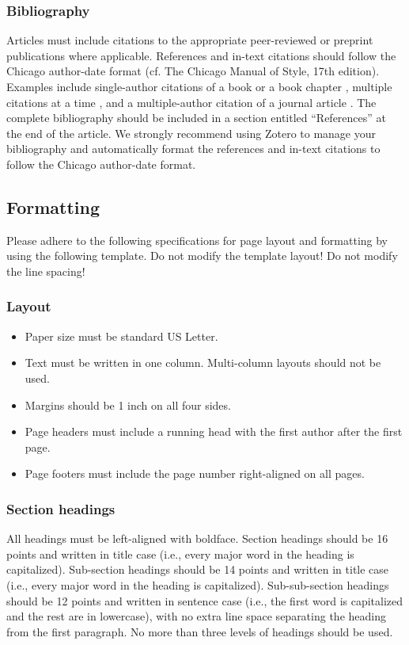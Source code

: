 \documentclass[12pt]{article}
\begin{document}
\subsubsection{Bibliography}
Articles must include citations to the appropriate peer-reviewed or preprint publications where applicable. References and in-text citations should follow the Chicago author-date format (cf. The Chicago Manual of Style, 17th edition). Examples include single-author citations of a book \parencite{tymoczko_geometry_2011} or a book chapter \parencite{spiegel_thoughts_2018}, multiple citations at a time \parencite{schoenberg_theory_2010, wyschnegradsky_manual_2017}, and a multiple-author citation of a journal article \parencite{michon_mobile_2017}. The complete bibliography should be included in a section entitled “References” at the end of the article. We strongly recommend using Zotero to manage your bibliography and automatically format the references and in-text citations to follow the Chicago author-date format.

\subsection{Formatting}

Please adhere to the following specifications for page layout and formatting by using the following template. Do not modify the template layout! Do not modify the line spacing!

\subsubsection{Layout}
\begin{itemize}[noitemsep]
    \item Paper size must be standard US Letter.
    \item Text must be written in one column. Multi-column layouts should not be used.
    \item Margins should be 1 inch on all four sides.
    \item Page headers must include a running head with the first author after the first page. 
    \item Page footers must include the page number right-aligned on all pages. 
\end{itemize}

\subsubsection{Section headings}
All headings must be left-aligned with boldface. Section headings should be 16 points and written in title case (i.e., every major word in the heading is capitalized). Sub-section headings should be 14 points and written in title case (i.e., every major word in the heading is capitalized). Sub-sub-section headings should be 12 points and written in sentence case (i.e., the first word is capitalized and the rest are in lowercase), with no extra line space separating the heading from the first paragraph. No more than three levels of headings should be used.
\end{document}

